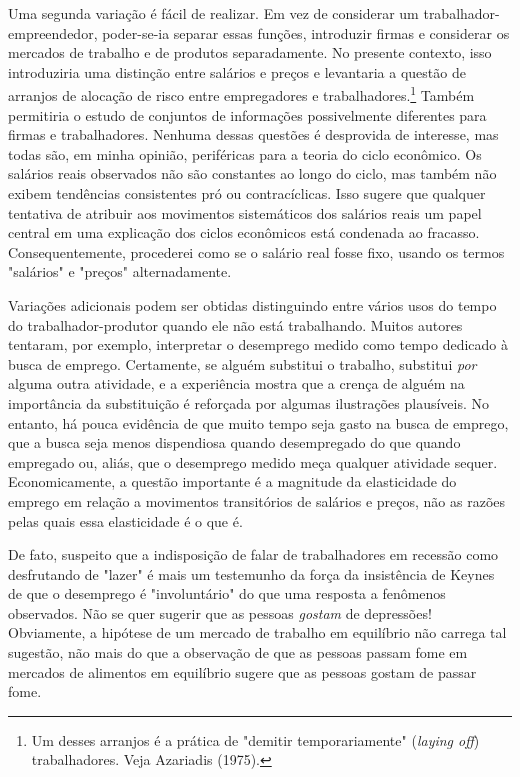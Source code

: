 \documentclass[12pt]{article}
\begin{document}
Uma segunda variação é fácil de realizar. Em vez de considerar um trabalhador-empreendedor, poder-se-ia separar essas funções, introduzir firmas e considerar os mercados de trabalho e de produtos separadamente. No presente contexto, isso introduziria uma distinção entre salários e preços e levantaria a questão de arranjos de alocação de risco entre empregadores e trabalhadores.\footnote{Um desses arranjos é a prática de "demitir temporariamente" (\textit{laying off}) trabalhadores. Veja Azariadis (1975).} Também permitiria o estudo de conjuntos de informações possivelmente diferentes para firmas e trabalhadores. Nenhuma dessas questões é desprovida de interesse, mas todas são, em minha opinião, periféricas para a teoria do ciclo econômico. Os salários reais observados não são constantes ao longo do ciclo, mas também não exibem tendências consistentes pró ou contracíclicas. Isso sugere que qualquer tentativa de atribuir aos movimentos sistemáticos dos salários reais um papel central em uma explicação dos ciclos econômicos está condenada ao fracasso. Consequentemente, procederei como se o salário real fosse fixo, usando os termos "salários" e "preços" alternadamente.

Variações adicionais podem ser obtidas distinguindo entre vários usos do tempo do trabalhador-produtor quando ele não está trabalhando. Muitos autores tentaram, por exemplo, interpretar o desemprego medido como tempo dedicado à busca de emprego. Certamente, se alguém substitui o trabalho, substitui \textit{por} alguma outra atividade, e a experiência mostra que a crença de alguém na importância da substituição é reforçada por algumas ilustrações plausíveis. No entanto, há pouca evidência de que muito tempo seja gasto na busca de emprego, que a busca seja menos dispendiosa quando desempregado do que quando empregado ou, aliás, que o desemprego medido meça qualquer atividade sequer. Economicamente, a questão importante é a magnitude da elasticidade do emprego em relação a movimentos transitórios de salários e preços, não as razões pelas quais essa elasticidade é o que é.

De fato, suspeito que a indisposição de falar de trabalhadores em recessão como desfrutando de "lazer" é mais um testemunho da força da insistência de Keynes de que o desemprego é "involuntário" do que uma resposta a fenômenos observados. Não se quer sugerir que as pessoas \textit{gostam} de depressões! Obviamente, a hipótese de um mercado de trabalho em equilíbrio não carrega tal sugestão, não mais do que a observação de que as pessoas passam fome em mercados de alimentos em equilíbrio sugere que as pessoas gostam de passar fome.
\end{document}
